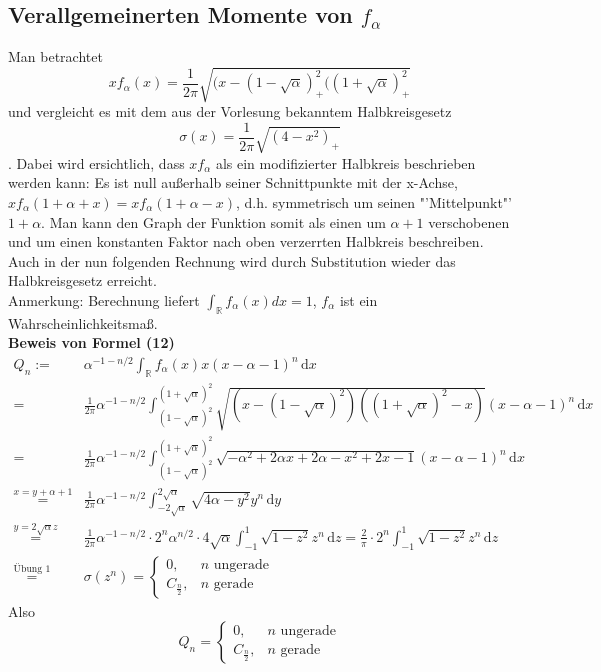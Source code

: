 \documentclass[a4paper, 11pt]{scrreprt}
\newcommand{\RR}{\mathbb{R}}
\begin{document}
\subsection*{Verallgemeinerten Momente von $ f_\alpha $}
Man betrachtet \[xf_{\alpha}(x)=\frac{1}{2\pi}\sqrt{(x-(1-\sqrt{\alpha})^2_{+}((1+\sqrt{\alpha})^2_{+}} \] und vergleicht es mit dem aus der Vorlesung bekanntem Halbkreisgesetz \[ \sigma(x)= \frac{1}{2 \pi} \sqrt{(4-x^2)_+}\].
Dabei wird ersichtlich, dass $ xf_\alpha $ als ein modifizierter Halbkreis beschrieben werden kann: Es ist null außerhalb seiner Schnittpunkte mit der x-Achse, $ xf_\alpha(1+\alpha +x)=xf_\alpha (1+\alpha -x) $, d.h. symmetrisch um seinen "'Mittelpunkt"' $ 1+\alpha $. Man kann den Graph der Funktion somit als einen um $ \alpha +1 $ verschobenen und um einen konstanten Faktor nach oben verzerrten Halbkreis beschreiben. Auch in der nun folgenden Rechnung wird durch Substitution wieder das Halbkreisgesetz erreicht. \\
Anmerkung: Berechnung liefert $ \int_{\RR} f_\alpha(x)dx=1 $, $ f_\alpha $ ist ein Wahrscheinlichkeitsmaß.\\

\textbf{Beweis von Formel (12)}\\
\begin{align*}
	Q_n :=& \alpha^{-1-n/2}\int_{\RR} f_{\alpha}(x)x(x-\alpha -1)^n\,\mathrm{d}x \\
	 =& \frac{1}{2\pi}\alpha^{-1-n/2} \int_{(1-\sqrt{\alpha})^2}^{(1+\sqrt{\alpha})^2} \sqrt{(x-(1-\sqrt{\alpha})^2)((1+\sqrt{\alpha})^2-x)} (x-\alpha -1)^n \,\mathrm{d}x\\
	=& \frac{1}{2\pi}\alpha^{-1-n/2} \int_{(1-\sqrt{\alpha})^2}^{(1+\sqrt{\alpha})^2} \sqrt{-\alpha^2+2\alpha x+2\alpha -x^2+2x-1}(x-\alpha-1)^n \,\mathrm{d}x\\
	\overset{x=y+\alpha+1}{=}& \frac{1}{2\pi}\alpha^{-1-n/2} \int_{-2\sqrt{\alpha}}^{2\sqrt{\alpha}} \sqrt{4\alpha -y^2} y^n \,\mathrm{d}y\\
	\overset{y=2\sqrt{\alpha}z}{=}& \frac{1}{2\pi}\alpha^{-1-n/2} \cdot 2^n \alpha^{n/2}\cdot4\sqrt{\alpha}\int_{-1}^{1} \sqrt{1-z^2}z^n \,\mathrm{d}z = \frac{2}{\pi} \cdot 2^n\int_{-1}^{1} \sqrt{1-z^2}z^n\,\mathrm{d}z \\
	\overset{\text{Übung 1}}{=}& \sigma(z^n) = \begin{cases} 0, &n\text{ ungerade}\\
	C_{\frac n 2}, &n\text{ gerade} \end{cases}
\end{align*}
Also \begin{equation}
Q_n=\begin{cases} 0, &n\text{ ungerade}\\
	C_{\frac n 2}, &n\text{ gerade} \end{cases}
\end{equation}\\
\end{document}
